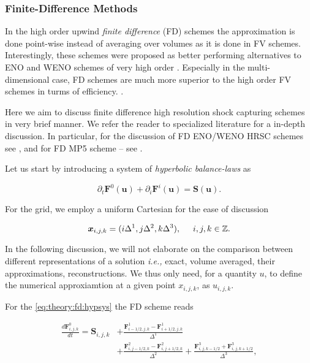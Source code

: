 \subsubsection{Finite-Difference Methods}



In the high order upwind \textit{finite difference} (FD) schemes the approximation is done point-wise instead of averaging over volumes as it is done in FV schemes. 
Interestingly, these schemes were proposed as better performing alternatives to ENO and WENO schemes of very high order \cite{Shu:1988,Shu:1989,Jiang:1996}. 
Especially in the multi-dimensional case, FD schemes are much more superior to the high order FV schemes in turms of efficiency. \cite{Shu:1999,Shu:2003}. 

Here we aim to discuss finite difference high resolution shock capturing schemes in very brief manner. 
We refer the reader to specialized literature for a in-depth discussion. In particular, for the discussion of FD ENO/WENO HRSC schemes see \cite{Shu:1999}, and for FD MP5 scheme -- see \cite{Mignone:2010}. 

Let us start by introducing a system of \textit{hyperbolic balance-laws} as

\begin{equation}
\partial_t\boldsymbol{F}^0(\boldsymbol{u}) + \partial_i\boldsymbol{F}^i(\boldsymbol{u}) = \boldsymbol{S}(\boldsymbol{u}).
\label{eq:theory:fd:hypsys}
\end{equation}

For the grid, we employ a uniform Cartesian for the ease of discussion 

\begin{equation}
\boldsymbol{x}_{i,j,k} = (i\Delta^1, j\Delta^2, k\Delta^3), \hspace{5mm} i,j,k\in \mathbb{Z}.
\end{equation}

In the following discussion, we will not elaborate on the comparison between different representations of a solution \textit{i.e.,} exact, volume averaged, their approximations, reconstructions. 
We thus only need, for a quantity $u$, to define the numerical approxiamtion at a given point $x_{i,j,k}$, as $u_{i,j,k}$. 

For the \ref{eq:theory:fd:hypsys} the FD scheme reads

\begin{align}
\frac{d\boldsymbol{F}^{0}_{i,j,k}}{dt} = \boldsymbol{S}_{i,j,k} &+ \frac{\boldsymbol{F}^{1}_{i-1/2,j,k} - \boldsymbol{F}^{1}_{i+1/2,j,k}}{\Delta^1} \\
& + \frac{\boldsymbol{F}^{2}_{i,j-1/2,k} - \boldsymbol{F}^{2}_{i,j+1/2,k}}{\Delta^2} + \frac{\boldsymbol{F}^{3}_{i,j,k-1/2} + \boldsymbol{F}^{3}_{i,j,k+1/2}}{\Delta^3},
\end{align}

